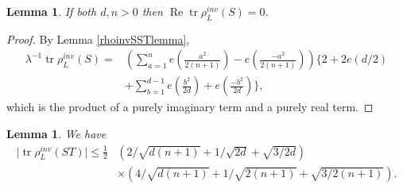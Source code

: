 \documentclass[12pt, a4paper]{article}
\newtheorem{lemma}[thm]{Lemma}
\newcommand{\opn}{\operatorname}
\begin{document}
\begin{lemma}\label{trrhoSlemma}
  If both $d, n>0$ then $\opn{Re} \opn{tr} \rho_L^{inv}(S) = 0$. \end{lemma}
\begin{proof}
  By Lemma \ref{rhoinvSSTlemma},
  \begin{align*}
    \lambda^{-1} \opn{tr}\rho_L^{inv}(S) =
    &     \left(  \sum_{a=1}^n e \left (\frac{a^2}{2(n+1)} \right ) - e \left (\frac{-a^2}{2(n+1)} \right ) \right ) \biggl \{  2 + 2e(d/2)  \\
     & +\sum_{b=1}^{d-1} e \left ( \frac{b^2}{2d} \right ) + e \left ( \frac{-b^2}{2d} \right ) \biggr \},
  \end{align*}
  which is the product of a purely imaginary term and a purely real term.
\end{proof}
\begin{lemma}\label{trrhoSTlemma}
  We have
  \begin{align*}
  \vert \opn{tr} \rho_L^{inv}(ST) \vert  
  \leq \frac{1}{2} & \left ( 2/\sqrt{d(n+1)} + 1/\sqrt{2d} + \sqrt{3/2d} \right ) \\
  &  \times \left ( 4/\sqrt{d(n+1)} + 1/\sqrt{2(n+1)} + \sqrt{3/2(n+1)} \right ).
\end{align*}
\end{lemma}
\end{document}
